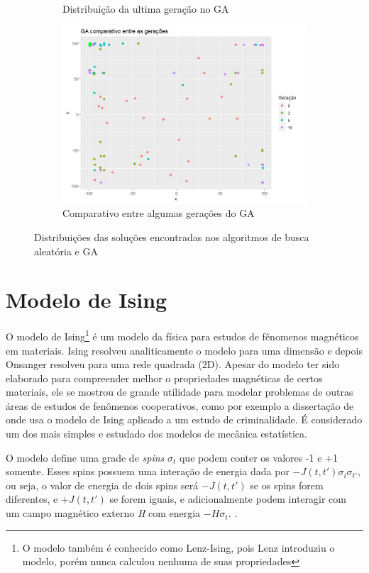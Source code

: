 \begin{figure}[ht]
\begin{subfigure}[b]{0.47\linewidth}
		\caption{Distribuição da ultima geração no GA}
	\end{subfigure}
	\begin{subfigure}[b]{0.65\linewidth}
		\includegraphics[width=\linewidth]{imagens/scatter_GA_P30_T10b.png}
		\caption{Comparativo entre algumas gerações do GA}
	\end{subfigure}
	\caption{Distribuições das soluções encontradas nos algoritmos de busca aleatória e GA}
	\label{fig:scatter_RS_GA}
\end{figure}



\section{Modelo de Ising}

O modelo de Ising\footnote{O modelo também é conhecido como Lenz-Ising, pois Lenz introduziu o modelo, porém nunca calculou nenhuma de suas propriedades} é um modelo da física para estudos de fênomenos magnéticos em materiais. Ising resolveu analiticamente o modelo para uma dimensão e depois Onsanger resolveu para uma rede quadrada (2D). Apesar do modelo ter sido elaborado para compreender melhor o propriedades magnéticas de certos materiais, ele se mostrou de grande utilidade para modelar problemas de outras áreas de estudos de fenômenos cooperativos, como por exemplo a dissertação de  onde usa o modelo de Ising aplicado a um estudo de criminalidade. É considerado um dos mais simples e estudado dos modelos de mecânica estatística.

O modelo define uma grade de \textit{spins} \(\sigma_t\) que podem conter os valores -1 e +1 somente. Esses spins possuem uma interação de energia dada por \(-J(t, t')\sigma_i\sigma_{t'}\), ou seja, o valor de energia de dois spins será \(-J(t, t')\) se os spins forem diferentes, e \(+J(t, t')\) se forem iguais, e adicionalmente podem interagir com um campo magnético externo \textit{H} com energia \(-H\sigma_t\). \cite{McCoy1973}.

